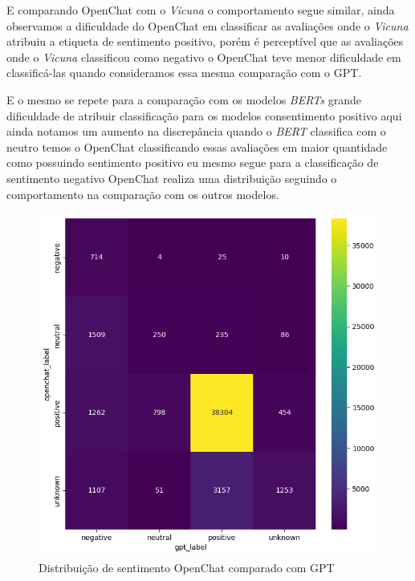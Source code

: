 E comparando OpenChat com o \textit{Vicuna} o comportamento segue similar, ainda observamos a dificuldade do OpenChat em classificar as avaliações onde o \textit{Vicuna} atribuiu a etiqueta de sentimento positivo, porém é perceptível que as avaliações onde o \textit{Vicuna} classificou como negativo o OpenChat teve menor dificuldade em classificá-las quando consideramos essa mesma comparação com o GPT.

E o mesmo se repete para a comparação com os modelos \textit{BERTs} grande dificuldade de atribuir classificação para os modelos consentimento positivo aqui ainda notamos um aumento na discrepância quando o \textit{BERT} classifica com o neutro temos o OpenChat classificando essas avaliações em maior quantidade como possuindo sentimento positivo eu mesmo segue para a classificação de sentimento negativo OpenChat realiza uma distribuição seguindo o comportamento na comparação com os outros modelos.

\begin{figure}
	\centering
	\includegraphics[width=.8\textwidth]{figs/openchat/heat_vs_gpt.png}
	\caption{Distribuição de sentimento OpenChat comparado com GPT}
	\label{img:heat_openchat_vs_gpt}
\end{figure}


